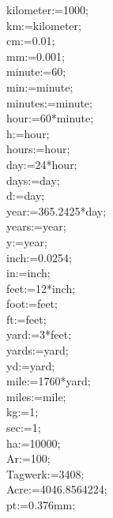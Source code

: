 \documentclass{article}
\newenvironment{eulernotebook}{\par}{\par}
\newenvironment{eulercomment}{\par\medskip}{\par\medskip}
\begin{document}
\begin{eulernotebook}
\begin{eulercomment}
kilometer\textdollar{}:=1000;\\
km\textdollar{}:=kilometer\textdollar{};\\
cm\textdollar{}:=0.01;\\
mm\textdollar{}:=0.001;\\
minute\textdollar{}:=60;\\
min\textdollar{}:=minute\textdollar{};\\
minutes\textdollar{}:=minute\textdollar{};\\
hour\textdollar{}:=60*minute\textdollar{};\\
h\textdollar{}:=hour\textdollar{};\\
hours\textdollar{}:=hour\textdollar{};\\
day\textdollar{}:=24*hour\textdollar{};\\
days\textdollar{}:=day\textdollar{};\\
d\textdollar{}:=day\textdollar{};\\
year\textdollar{}:=365.2425*day\textdollar{};\\
years\textdollar{}:=year\textdollar{};\\
y\textdollar{}:=year\textdollar{};\\
inch\textdollar{}:=0.0254;\\
in\textdollar{}:=inch\textdollar{};\\
feet\textdollar{}:=12*inch\textdollar{};\\
foot\textdollar{}:=feet\textdollar{};\\
ft\textdollar{}:=feet\textdollar{};\\
yard\textdollar{}:=3*feet\textdollar{};\\
yards\textdollar{}:=yard\textdollar{};\\
yd\textdollar{}:=yard\textdollar{};\\
mile\textdollar{}:=1760*yard\textdollar{};\\
miles\textdollar{}:=mile\textdollar{};\\
kg\textdollar{}:=1;\\
sec\textdollar{}:=1;\\
ha\textdollar{}:=10000;\\
Ar\textdollar{}:=100;\\
Tagwerk\textdollar{}:=3408;\\
Acre\textdollar{}:=4046.8564224;\\
pt\textdollar{}:=0.376mm;


\end{eulercomment}
\end{eulernotebook}
\end{document}
